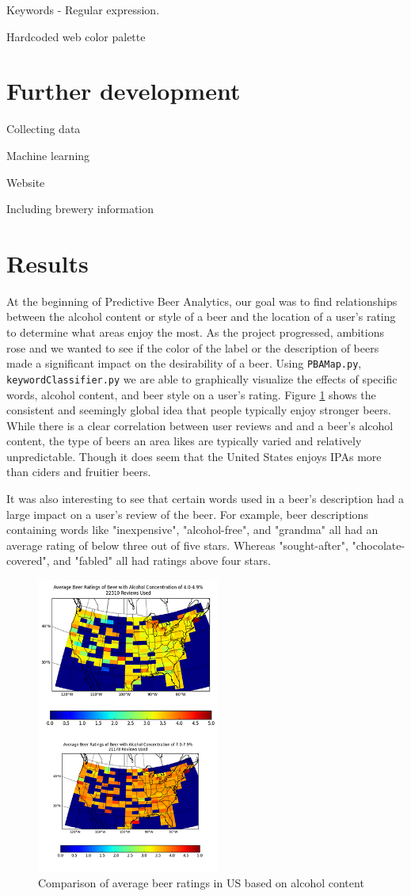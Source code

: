 \documentclass[10pt]{IEEEtran}
\begin{document}
Keywords - Regular expression.

Hardcoded web color palette

\section{Further development}
Collecting data

Machine learning

Website

Including brewery information


\section{Results}
At the beginning of Predictive Beer Analytics, our goal was to find relationships between the alcohol content or style of a beer and the location of a user's rating to determine what areas enjoy the most. As the project progressed, ambitions rose and we wanted to see if the color of the label or the description of beers made a significant impact on the desirability of a beer. Using \texttt{PBAMap.py}, \texttt{keywordClassifier.py} we are able to graphically visualize the effects of specific words, alcohol content, and beer style on a user's rating. Figure \ref{fig:abvcomp} shows the consistent and seemingly global idea that people typically enjoy stronger beers. While there is a clear correlation between user reviews and and a beer's alcohol content, the type of beers an area likes are typically varied and relatively unpredictable. Though it does seem that the United States enjoys IPAs more than ciders and fruitier beers.

It was also interesting to see that certain words used in a beer's description had a large impact on a user's review of the beer. For example, beer descriptions containing words like "inexpensive", "alcohol-free", and "grandma" all had an average rating of below three out of five stars. Whereas "sought-after", "chocolate-covered", and "fabled" all had ratings above four stars.

\begin{figure}[t]
  \centering
  \includegraphics[width=6cm]{./graphics/abvComp.png}
  \caption{Comparison of average beer ratings in US based on alcohol content}
  \label{fig:abvcomp}
\end{figure}
\end{document}
